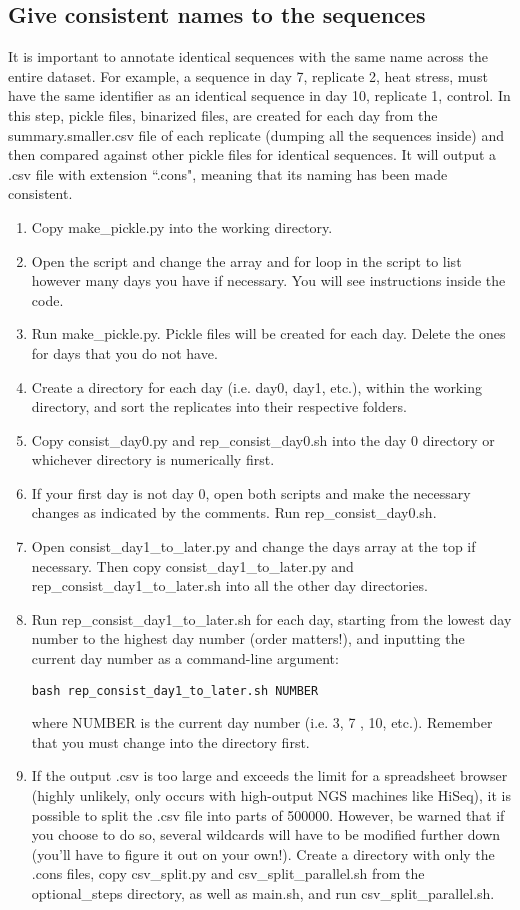 \documentclass[12pt,titlepage]{article}
\begin{document}
\subsection{Give consistent names to the sequences}
It is important to annotate identical sequences with the same name across the entire dataset. For example, a sequence in day 7, replicate 2, heat stress, must have the same identifier as an identical sequence in day 10, replicate 1, control. In this step, pickle files, binarized files, are created for each day from the summary.smaller.csv file of each replicate (dumping all the sequences inside) and then compared against other pickle files for identical sequences. It will output a .csv file with extension ``.cons", meaning that its naming has been made consistent. 
\begin{enumerate}
\item Copy make\_pickle.py into the working directory. 
\item Open the script and change the array and for loop in the script to list however many days you have if necessary. You will see instructions inside the code. 
\item Run make\_pickle.py. Pickle files will be created for each day. Delete the ones for days that you do not have. 
\item Create a directory for each day (i.e. day0, day1, etc.), within the working directory, and sort the replicates into their respective folders.
\item Copy consist\_day0.py and rep\_consist\_day0.sh into the day 0 directory or whichever directory is numerically first.
\item If your first day is not day 0, open both scripts and make the necessary changes as indicated by the comments. Run rep\_consist\_day0.sh.
\item Open consist\_day1\_to\_later.py and change the days array at the top if necessary. Then copy consist\_day1\_to\_later.py and rep\_consist\_day1\_to\_later.sh into all the other day directories. 
\item Run rep\_consist\_day1\_to\_later.sh for each day, starting from the lowest day number to the highest day number (order matters!), and inputting the current day number as a command-line argument:
\begin{tcolorbox}
\begin{lstlisting}
bash rep_consist_day1_to_later.sh NUMBER
\end{lstlisting}
\end{tcolorbox}where NUMBER is the current day number (i.e. 3, 7 , 10, etc.). Remember that you must change into the directory first.
\item If the output .csv is too large and exceeds the limit for a spreadsheet browser (highly unlikely, only occurs with high-output NGS machines like HiSeq), it is possible to split the .csv file into parts of 500000. However, be warned that if you choose to do so, several wildcards will have to be modified further down (you'll have to figure it out on your own!). Create a directory with only the .cons files, copy csv\_split.py and csv\_split\_parallel.sh from the optional\_steps directory, as well as main.sh, and run csv\_split\_parallel.sh.
\end{enumerate}
\end{document}
